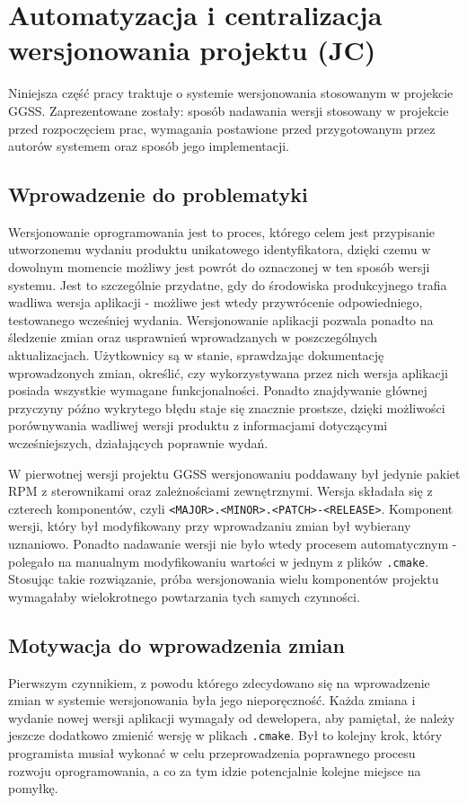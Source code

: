 \clearpage
\section{Automatyzacja i centralizacja wersjonowania projektu (JC)}
\label{ch:versioning}

Niniejsza część pracy traktuje o systemie wersjonowania stosowanym w projekcie GGSS. Zaprezentowane zostały: sposób nadawania wersji stosowany w projekcie przed rozpoczęciem prac, wymagania postawione przed przygotowanym przez autorów systemem oraz sposób jego implementacji.

\subsection{Wprowadzenie do problematyki}
Wersjonowanie oprogramowania jest to proces, którego celem jest przypisanie utworzonemu wydaniu produktu unikatowego identyfikatora, dzięki czemu w dowolnym momencie możliwy jest powrót do oznaczonej w ten sposób wersji systemu. Jest to szczególnie przydatne, gdy do środowiska produkcyjnego trafia wadliwa wersja aplikacji - możliwe jest wtedy przywrócenie odpowiedniego, testowanego wcześniej wydania. Wersjonowanie aplikacji pozwala ponadto na śledzenie zmian oraz usprawnień wprowadzanych w poszczególnych aktualizacjach. Użytkownicy są w stanie, sprawdzając dokumentację wprowadzonych zmian, określić, czy wykorzystywana przez nich wersja aplikacji posiada wszystkie wymagane funkcjonalności. Ponadto znajdywanie głównej przyczyny późno wykrytego błędu staje się znacznie prostsze, dzięki możliwości porównywania wadliwej wersji produktu z informacjami dotyczącymi wcześniejszych, działających poprawnie wydań.

W pierwotnej wersji projektu GGSS wersjonowaniu poddawany był jedynie pakiet RPM z sterownikami oraz zależnościami zewnętrznymi. Wersja składała się z czterech komponentów, czyli \lstinline{<MAJOR>.<MINOR>.<PATCH>-<RELEASE>}. Komponent wersji, który był modyfikowany przy wprowadzaniu zmian był wybierany uznaniowo. Ponadto nadawanie wersji nie było wtedy procesem automatycznym - polegało na manualnym modyfikowaniu wartości w jednym z plików \lstinline{.cmake}. Stosując takie rozwiązanie, próba wersjonowania wielu komponentów projektu wymagałaby wielokrotnego powtarzania tych samych czynności.

\subsection{Motywacja do wprowadzenia zmian}
Pierwszym czynnikiem, z powodu którego zdecydowano się na wprowadzenie zmian w systemie wersjonowania była jego nieporęczność. Każda zmiana i wydanie nowej wersji aplikacji wymagały od dewelopera, aby pamiętał, że należy jeszcze dodatkowo zmienić wersję w plikach \lstinline{.cmake}. Był to kolejny krok, który programista musiał wykonać w celu przeprowadzenia poprawnego procesu rozwoju oprogramowania, a co za tym idzie potencjalnie kolejne miejsce na pomyłkę. 

